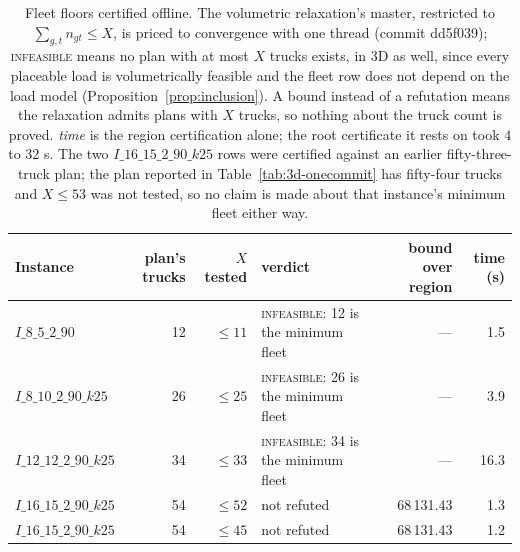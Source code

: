 \begin{table}[!htbp]
\centering
\small
\caption{Fleet floors certified offline. The volumetric relaxation's
master, restricted to $\sum_{g,t}n_{gt}\le X$, is priced to convergence
with one thread (commit dd5f039); \textsc{infeasible} means no plan with
at most $X$ trucks exists, in 3D as well, since every placeable load is
volumetrically feasible and the fleet row does not depend on the load
model (Proposition~\ref{prop:inclusion}). A bound instead of a refutation
means the relaxation admits plans with $X$ trucks, so nothing about the
truck count is proved. \emph{time} is the region certification alone;
the root certificate it rests on took $4$ to $32$ s. The two
$I\_16\_15\_2\_90\_k25$ rows were certified against an earlier
fifty-three-truck plan; the plan reported in
Table~\ref{tab:3d-onecommit} has fifty-four trucks and $X\le53$ was
not tested, so no claim is made about that instance's minimum fleet
either way.}
\label{tab:fleetfloor}
\begin{tabular}{lrrlrr}
\toprule
Instance & plan's trucks & $X$ tested & verdict & bound over region & time (s) \\
\midrule
$I\_8\_5\_2\_90$ & 12 & $\le11$ & \textsc{infeasible}: 12 is the minimum fleet & --- & 1.5 \\
$I\_8\_10\_2\_90\_k25$ & 26 & $\le25$ & \textsc{infeasible}: 26 is the minimum fleet & --- & 3.9 \\
$I\_12\_12\_2\_90\_k25$ & 34 & $\le33$ & \textsc{infeasible}: 34 is the minimum fleet & --- & 16.3 \\
$I\_16\_15\_2\_90\_k25$ & 54 & $\le52$ & not refuted & 68\,131.43 & 1.3 \\
$I\_16\_15\_2\_90\_k25$ & 54 & $\le45$ & not refuted & 68\,131.43 & 1.2 \\
\bottomrule
\end{tabular}
\end{table}
